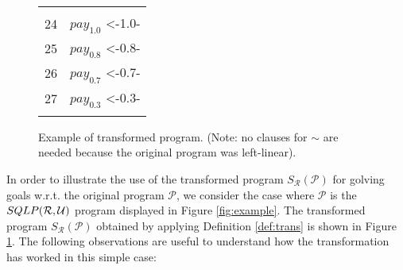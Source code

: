 \documentclass{sigplanconf}
\newcommand{\U}{\mathcal{U}}
\newcommand{\simrel}{\mathcal{R}}
\newcommand{\trans}[2]{S_{#1}(#2)}
\newcommand{\Prog}{\mathcal{P}} \newcommand{\UProg}{\mathcal{P_U}}
\theoremstyle{definition}
\theoremstyle{plain}
\begin{document}
\begin{figure}[ht]
\begin{center}
\begin{tabular}{|r@{\hspace{0.2cm}}l|}
&\\
\scriptsize 24 & $pay_{1.0}$ <-1.0- \\
\scriptsize 25 & $pay_{0.8}$ <-0.8- \\
\scriptsize 26 & $pay_{0.7}$ <-0.7- \\
\scriptsize 27 & $pay_{0.3}$ <-0.3- \\
& \\
\hline
\end{tabular}
\end{center}
\caption{Example of transformed program. (Note: no clauses for $\sim$ are needed because the original program was left-linear). \label{fig:exampletrans}}
\end{figure}

In order to illustrate the use of  the transformed program $\trans{\simrel}{\Prog}$ for golving goals w.r.t. the original program $\Prog$, we consider the case where $\Prog$ is the $\sqlp{\simrel}{\U}$ program displayed in Figure \ref{fig:example}. The transformed program $\trans{\simrel}{\Prog}$ obtained by applying Definition \ref{def:trans} is shown in Figure \ref{fig:exampletrans}.  The following observations are useful to understand how the transformation has worked in this simple case:
\end{document}
